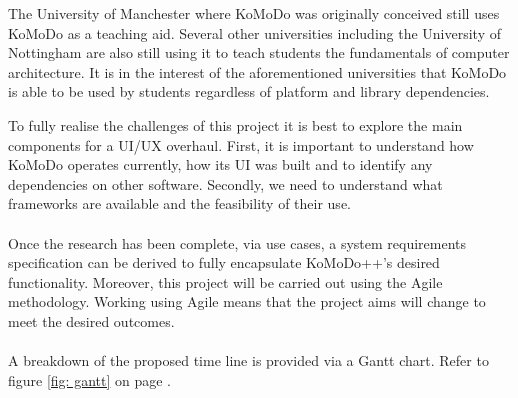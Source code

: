 The University of Manchester where KoMoDo was originally conceived still uses KoMoDo as a teaching aid. Several other universities including the University of Nottingham are also still using it to teach students the fundamentals of computer architecture. It is in the interest of the aforementioned universities that KoMoDo is able to be used by students regardless of platform and library dependencies.

To fully realise the challenges of this project it is best to explore the main components for a UI/UX overhaul. First, it is important to understand how KoMoDo operates currently, how its UI was built and to identify any dependencies on other software. Secondly, we need to understand what frameworks are available and the feasibility of their use. \\\\
%
Once the research has been complete, via use cases, a system requirements specification can be derived to fully encapsulate KoMoDo++'s desired functionality. Moreover, this project will be carried out using the Agile methodology. Working using Agile means that the project aims will change to meet the desired outcomes.\\\\
%
A breakdown of the proposed time line is provided via a Gantt chart. Refer to figure \ref{fig: gantt} on page \pageref{fig: gantt}.
